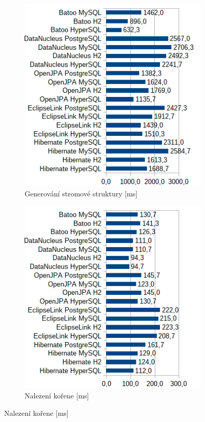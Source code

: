 \begin{figure}[!h]
  \begin{subfigure}[b]{1\textwidth}
  \includegraphics[width=25em]{obr/bench/jpa1}
  \caption{Generování stromové struktury [ms]}\label{img:jpa1}
  \end{subfigure}
  \begin{subfigure}[b]{1\textwidth}
  \includegraphics[width=25em]{obr/bench/jpa2}
  \caption{Nalezení kořene [ms]}\label{img:jpa2}
  \end{subfigure}
\end{figure}

